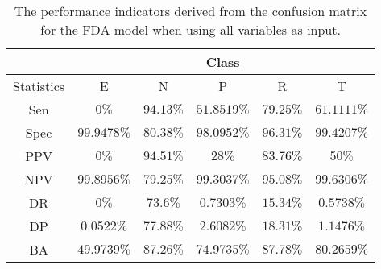 \begin{table}[!ht]
	\centering
	\begin{tabular}{|c|c|c|c|c|c|}
		\hline
		 & \multicolumn{5}{c|}{Class} \\ \hline
		Statistics & E & N & P & R & T \\ \hline
		Sen & $0\%$ & $94.13\%$ & $51.8519\%$ & $79.25\%$ & $61.1111\%$ \\ \hline
		Spec & $99.9478\%$ & $80.38\%$ & $98.0952\%$ & $96.31\%$ & $99.4207\%$ \\ \hline
		PPV & $0\%$ & $94.51\%$ & $28\%$ & $83.76\%$ & $50\%$ \\ \hline
		NPV & $99.8956\%$ & $79.25\%$ & $99.3037\%$ & $95.08\%$ & $99.6306\%$ \\ \hline
		DR & $0\%$ & $73.6\%$ & $0.7303\%$ & $15.34\%$ & $0.5738\%$ \\ \hline
		DP & $0.0522\%$ & $77.88\%$ & $2.6082\%$ & $18.31\%$ & $1.1476\%$ \\ \hline
		BA & $49.9739\%$ & $87.26\%$ & $74.9735\%$ & $87.78\%$ & $80.2659\%$ \\ \hline
	\end{tabular}
	\caption{The performance indicators derived from the confusion matrix for the FDA model when using all variables as input.}
	\label{tab:cs:reverse:all:fda}
\end{table}
